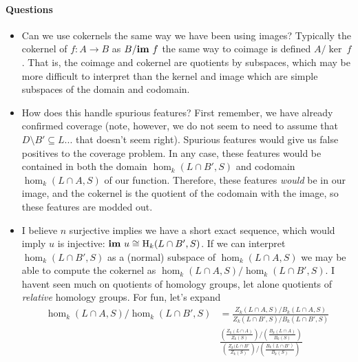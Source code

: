 \documentclass[12pt]{article}
\begin{document}
\paragraph{Questions}
\begin{itemize}
  \item Can we use cokernels the same way we have been using images?
    Typically the cokernel of $f: A\to B$ as $B/\mathbf{im}~f$ the same way to coimage is defined $A/\ker~f$.
    That is, the coimage and cokernel are quotients by subspaces, which may be more difficult to interpret than the kernel and image which are simple subspaces of the domain and codomain.
  \item How does this handle spurious features?
    First remember, we have already confirmed coverage (note, however, we do not seem to need to assume that $D\setminus B'\subseteq L$... that doesn't seem right).
    Spurious features would give us false positives to the coverage problem.
    In any case, these features would be contained in both the domain $\hom_k(L\cap B', S)$ and codomain $\hom_k(L\cap A, S)$ of our function.
    Therefore, these features \emph{would} be in our image, and the cokernel is the quotient of the codomain with the image, so these features are modded out.
  \item I believe $n$ surjective implies we have a short exact sequence, which would imply $u$ is injective: $\mathbf{im}~u\cong \mathrm{H}_k(L\cap B', S)$.
    If we can interpret $\hom_k(L\cap B', S)$ as a (normal) subspace of $\hom_k(L\cap A, S)$ we may be able to compute the cokernel as $\hom_k(L\cap A, S) / \hom_k(L\cap B', S)$.
    I havent seen much on quotients of homology groups, let alone quotients of \emph{relative} homology groups.
    For fun, let's expand
    \begin{align*}
      \hom_k(L\cap A, S) / \hom_k(L\cap B', S) &= \frac{Z_k(L\cap A, S) / B_k(L\cap A, S)}{Z_k(L\cap B', S) / B_k(L\cap B', S)}\\
        & \frac{
            \left(\frac{Z_k(L\cap A)}{Z_k(S)}\right) / \left(\frac{B_k(L\cap A)}{B_k(S)}\right)
          }{
            \left(\frac{Z_k(L\cap B'}{Z_k(S)}\right) / \left(\frac{B_k(L\cap B')}{B_k(S)}\right)
          }
    \end{align*}

\end{itemize}
\end{document}
